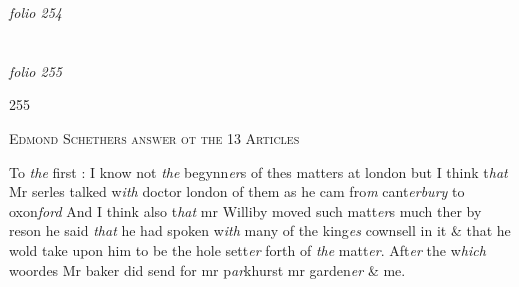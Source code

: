 \documentclass[12pt, a4paper]{book}
\begin{document}
\dotfill
						\newpage
{}

\textit{folio 254}


         \vspace*{4cm}
         
\dotfill
						  \section*{}  \subsection*{}

\textit{folio 255}



\begin{flushright}{\color{Mahogany}255}\end{flushright}


				\begin{center} \begin{large} {\scshape Edmond Schethers answer ot the 13 Articles} \end{large} \end{center}
			
            		
            			
				\marginpar[\vspace{0.5cm}{\textcolor{Gray}{1}}]{}
			
            			
				\marginpar[\vspace{0.5cm}{\textcolor{Gray}{D willoughby}}]{}
			
            			
		\ifthenelse{\isodd{\thepage}}
		{\reversemarginpar}
		{\normalmarginpar}
		To \textit{the} first : I know not \textit{the} begynn\textit{er}s of thes matters at london but I think
 t\textit{hat} Mr serles talked w\textit{ith} doctor london of them as he cam fro\textit{m} cant\textit{erbury} to oxon\textit{ford} And
 I think also t\textit{hat} mr Williby moved such matt\textit{er}s much ther by reson he said \textit{that}
he had spoken w\textit{ith }many of the king\textit{es} cownsell in it \& that he wold take upon
	him to be the hole sett\textit{er} forth of \textit{the} matt\textit{er}. Aft\textit{er }the w\textit{hich} woordes Mr baker did 
	send for mr p\textit{ar}khurst mr garden\textit{er} \& me. 
            		
		
				\marginpar[\vspace{0.5cm}{\textcolor{Gray}{2}}]{}
			
\end{document}
